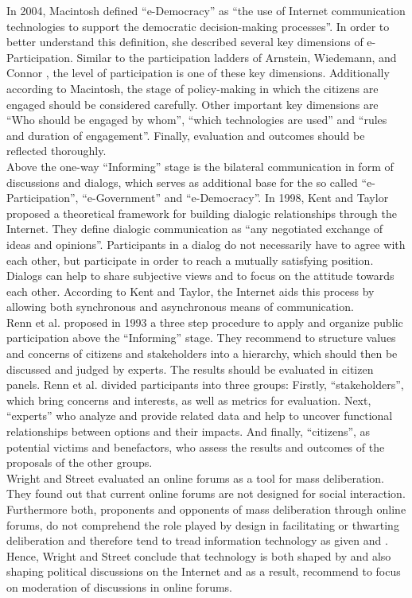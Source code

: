 In 2004, Macintosh \cite{Macintosh2004_eParticipation_characterization} defined ``e-Democracy'' as ``the use of Internet communication technologies to support the democratic decision-making processes''. In order to better understand this definition, she described several key dimensions of e-Participation. Similar to the participation ladders of Arnstein, Wiedemann, and Connor \cite{Arnstein1969_citizen_participation,Wiedemann1993355,Connor1988_new_ladder}, the level of participation is one of these key dimensions. Additionally according to Macintosh, the stage of policy-making in which the citizens are engaged should be considered carefully. Other important key dimensions are ``Who should be engaged by whom'', ``which technologies are used'' and ``rules and duration of engagement''. Finally, evaluation and outcomes should be reflected thoroughly.\\
Above the one-way ``Informing'' stage is the bilateral communication in form of discussions and dialogs, which serves as additional base for the so called ``e-Participation'', ``e-Government'' and ``e-Democracy''. In 1998, Kent and Taylor \cite{Kent1998_dialogic_relationships_through_www} proposed a theoretical framework for building dialogic relationships through the Internet. They define dialogic communication as ``any negotiated exchange of ideas and opinions''. Participants in a dialog do not necessarily have to agree with each other, but participate in order to reach a mutually satisfying position. Dialogs can help to share subjective views and to focus on the attitude towards each other. According to Kent and Taylor, the Internet aids this process by allowing both synchronous and asynchronous means of communication.\\
Renn et al. \cite{Renn1993_participation} proposed in 1993 a three step procedure to apply and organize public participation above the ``Informing'' stage. They recommend to structure values and concerns of citizens and stakeholders into a hierarchy, which should then be discussed and judged by experts. The results should be evaluated in citizen panels. Renn et al. divided participants into three groups: Firstly, ``stakeholders'', which bring concerns and interests, as well as metrics for evaluation. Next, ``experts'' who analyze and provide related data and help to uncover functional relationships between options and their impacts. And finally, ``citizens'', as potential victims and benefactors, who assess the results and outcomes of the proposals of the other groups.\\
Wright and Street \cite{Wright2007_deliberation_design} evaluated an online forums as a tool for mass deliberation. They found out that current online forums are not designed for social interaction. Furthermore both, proponents and opponents of mass deliberation through online forums, do not comprehend the role played by design in facilitating or thwarting deliberation and therefore tend to tread information technology as given and . Hence, Wright and Street conclude that technology is both shaped by and also shaping political discussions on the Internet and as a result, recommend to focus on moderation of discussions in online forums.\\
